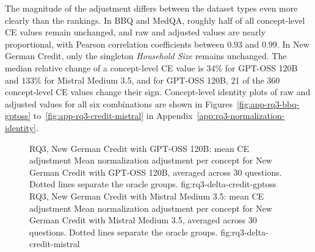 \begin{table}[htb]
  \centering
  \caption[RQ3: per-question preservation of concept rankings]{Per-question preservation of concept rankings. \textit{Exact} counts questions whose raw and adjusted rankings are identical ($\rho=1$). The median and minimum refer to the per-question Spearman correlations.}
  \label{tab:rq3-ranking-summary}
  \small
  \setlength{\tabcolsep}{4pt}
  \renewcommand{\arraystretch}{1.1}
\end{table}

The magnitude of the adjustment differs between the dataset types even more clearly than the rankings. In BBQ and MedQA, roughly half of all concept-level CE values remain unchanged, and raw and adjusted values are nearly proportional, with Pearson correlation coefficients between $0.93$ and $0.99$. In New German Credit, only the singleton \textit{Household Size} remains unchanged. The median relative change of a concept-level CE value is $34\%$ for GPT-OSS 120B and $133\%$ for Mistral Medium 3.5, and for GPT-OSS 120B, 21 of the 360 concept-level CE values change their sign. Concept-level identity plots of raw and adjusted values for all six combinations are shown in Figures~\ref{fig:app-rq3-bbq-gptoss} to~\ref{fig:app-rq3-credit-mistral} in Appendix~\ref{app:rq3-normalization-identity}.

\begin{figure}[htb]
  \centering
    {RQ3, New German Credit with GPT-OSS 120B: mean CE adjustment}%
    {Mean normalization adjustment per concept for New German Credit with GPT-OSS 120B, averaged across 30 questions. Dotted lines separate the oracle groups.}%
    {fig:rq3-delta-credit-gptoss}%
  \hfill
    {RQ3, New German Credit with Mistral Medium 3.5: mean CE adjustment}%
    {Mean normalization adjustment per concept for New German Credit with Mistral Medium 3.5, averaged across 30 questions. Dotted lines separate the oracle groups.}%
    {fig:rq3-delta-credit-mistral}%
\end{figure}

